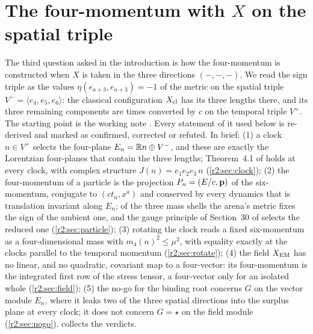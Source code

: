 \section{\texorpdfstring{The four-momentum with $X$ on the spatial triple}{The four-momentum with X on the spatial triple}}
\label{r2:sec:main}

The third question asked in the introduction is how the four-momentum is constructed when $X$ is taken in the three directions
$(-,-,-)$. We read the sign triple as the values $\eta(e_{a+3},e_{a+3})=-1$ of the metric on the spatial triple $V^-=\langle e_4,e_5,e_6\rangle$:
the classical configuration $X_{\rm cl}$ has its three lengths there, and its three remaining components are times converted by $c$ on the
temporal triple $V^+$. The starting point is the working note \cite{FMB}. Every statement of it used below is re-derived and marked as
confirmed, corrected or refuted. In brief:
(1) a clock $n\in V^+$ selects the four-plane $E_n=\mathbb{R} n\oplus V^-$, and these are exactly the Lorentzian four-planes that contain the three
lengths; Theorem~4.1 of \cite{ES17} holds at every clock, with complex structure $J(n)=e_1e_2e_3\,n$ (\cref{r2:sec:clock});
(2) the four-momentum of a particle is the projection $P_n=(E/c,\mathbf p)$ of the six-momentum, conjugate to $(ct_n,x^a)$ and conserved by every dynamics
that is translation invariant along $E_n$; of the three mass shells the arena's metric fixes the sign of the ambient one, and the gauge
principle of Section~30 of \cite{ES17} selects the reduced one (\cref{r2:sec:particle});
(3) rotating the clock reads a fixed six-momentum as a four-dimensional mass with $m_4(n)^2\le\mu^2$, with equality exactly at the clocks
parallel to the temporal momentum (\cref{r2:sec:rotate});
(4) the field $X_{\rm EM}$ has no linear, and no quadratic, covariant map to a four-vector: its four-momentum is the integrated first row of the
stress tensor, a four-vector only for an isolated whole (\cref{r2:sec:field});
(5) the no-go for the binding root concerns $G$ on the vector module $E_n$, where it leaks two of the three spatial directions into the surplus
plane at every clock; it does not concern $G=\star$ on the field module (\cref{r2:sec:nogo}).
 collects the verdicts.

